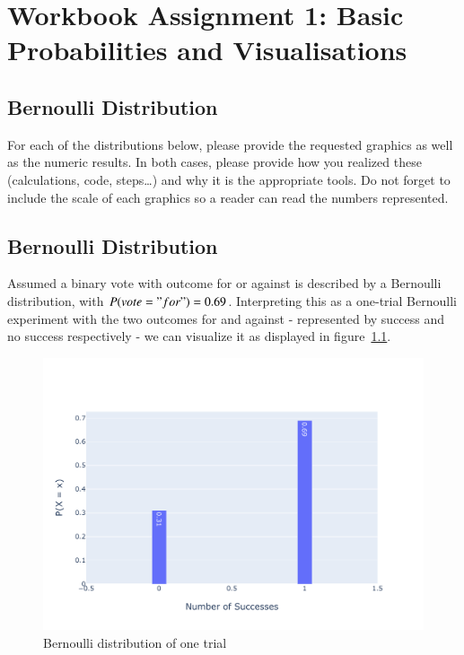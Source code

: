 \chapter{Workbook Assignment 1: Basic Probabilities and Visualisations}

\section{Bernoulli Distribution}
For each of the distributions below, please provide the requested graphics as well as the numeric results. In both cases, please provide how you realized these (calculations, code, steps…) and why it is the appropriate tools. Do not forget to include the scale of each graphics so a reader can read the numbers represented.

\section{Bernoulli Distribution}

Assumed a binary vote with outcome for or against is described by a Bernoulli distribution, with $P(vote = "for") = 0.69$. 
Interpreting this as a one-trial Bernoulli experiment with the two outcomes for and against - represented by success and no success respectively - we can visualize it as displayed in figure~\ref{fig:1a}.


\begin{figure}[h]
\centering
\includegraphics[width=16cm]{pics/1a.pdf}
\caption{Bernoulli distribution of one trial}
\label{fig:1a}
\end{figure}
\FloatBarrier


